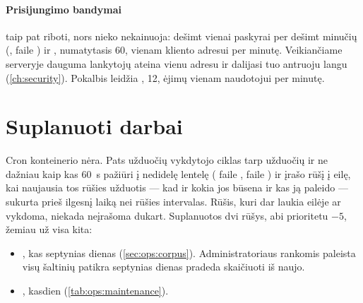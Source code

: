 \paragraph{Prisijungimo bandymai} taip pat riboti, nors nieko nekainuoja: dešimt vienai paskyrai
per dešimt minučių (,  faile )
ir , numatytasis 60, vienam kliento adresui per minutę. Veikiančiame
serveryje dauguma lankytojų ateina vienu adresu ir dalijasi tuo antruoju langu
(\cref{ch:security}). Pokalbis leidžia
, 12, ėjimų vienam naudotojui per minutę.


\section{Suplanuoti darbai}\label{sec:ops:schedule}

Cron konteinerio nėra. Pats užduočių vykdytojo ciklas tarp užduočių ir ne dažniau kaip kas 60~s
pažiūri į nedidelę lentelę ( faile ,
 faile ) ir įrašo rūšį į eilę,
kai naujausia tos rūšies užduotis --- kad ir kokia jos būsena ir kas ją paleido --- sukurta prieš
ilgesnį laiką nei rūšies intervalas. Rūšis, kuri dar laukia eilėje ar vykdoma, niekada neįrašoma
dukart. Suplanuotos dvi rūšys, abi prioritetu $-5$, žemiau už visa kita:

\begin{itemize}
  \item {}, kas septynias dienas (\cref{sec:ops:corpus}). Administratoriaus
    rankomis paleista visų šaltinių patikra septynias dienas pradeda skaičiuoti iš naujo.
  \item {}, kasdien (\cref{tab:ops:maintenance}).
\end{itemize}

